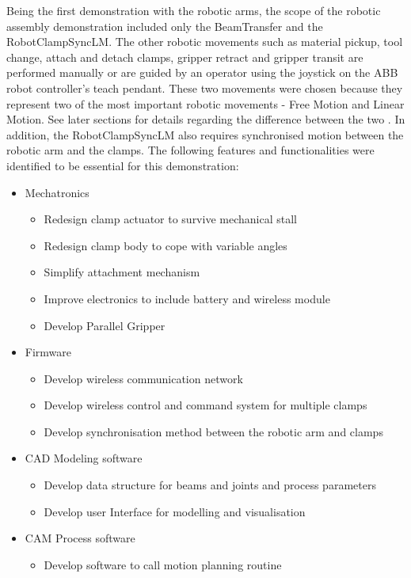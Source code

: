Being the first demonstration with the robotic arms, the scope of the robotic assembly demonstration included only the BeamTransfer and the RobotClampSyncLM. The other robotic movements such as material pickup, tool change, attach and detach clamps, gripper retract and gripper transit are performed manually or are guided by an operator using the joystick on the ABB robot controller’s teach pendant.
These two movements were chosen because they represent two of the most important robotic movements - Free Motion and Linear Motion. See later sections for details regarding the difference between the two . In addition, the RobotClampSyncLM also requires synchronised motion between the robotic arm and the clamps.
The following features and functionalities were identified to be essential for this demonstration:
\begin{itemize}
    \item Mechatronics
    \begin{itemize}
        \item Redesign clamp actuator to survive mechanical stall
        \item Redesign clamp body to cope with variable angles
        \item Simplify attachment mechanism
        \item Improve electronics to include battery and wireless module
        \item Develop Parallel Gripper
    \end{itemize}
    \item Firmware
    \begin{itemize}
        \item Develop wireless communication network
        \item Develop wireless control and command system for multiple clamps
        \item Develop synchronisation method between the robotic arm and clamps
    \end{itemize}
    \item CAD Modeling software 
    \begin{itemize}
        \item Develop data structure for beams and joints and process parameters
        \item Develop user Interface for modelling and visualisation
    \end{itemize}
    \item CAM Process software
    \begin{itemize}
        \item Develop software to call motion planning routine
    \end{itemize}
\end{itemize}

